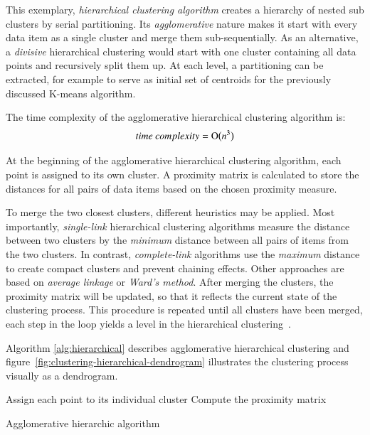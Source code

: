 This exemplary, \textit{hierarchical clustering algorithm} creates a hierarchy of nested sub clusters by serial partitioning. Its \textit{agglomerative} nature makes it start with every data item as a single cluster and merge them sub-sequentially. As an alternative, a \textit{divisive} hierarchical clustering would start with one cluster containing all data points and recursively split them up. At each level, a partitioning can be extracted, for example to serve as initial set of centroids for the previously discussed K-means algorithm. 

The time complexity of the agglomerative hierarchical clustering algorithm is:
\[time~complexity = \operatorname{O}\bigl(n^3\bigr)\]

At the beginning of the agglomerative hierarchical clustering algorithm, each point is assigned to its own cluster. A proximity matrix is calculated to store the distances for all pairs of data items based on the chosen proximity measure.

To merge the two closest clusters, different heuristics may be applied. Most importantly, \textit{single-link} hierarchical clustering algorithms measure the distance between two clusters by the \textit{minimum} distance between all pairs of items from the two clusters. In contrast, \textit{complete-link} algorithms use the \textit{maximum} distance to create compact clusters and prevent chaining effects. Other approaches are based on \textit{average linkage} or \textit{Ward's method}. After merging the clusters, the proximity matrix will be updated, so that it reflects the current state of the clustering process. This procedure is repeated until all clusters have been merged, each step in the loop yields a level in the hierarchical clustering~\cite{Jain88clustering, Jain99clusterreview, Meert06clustermaps}.

Algorithm \ref{alg:hierarchical} describes agglomerative hierarchical clustering and figure~\ref{fig:clustering-hierarchical-dendrogram} illustrates the clustering process visually as a dendrogram.

\begin{algorithm}[h]
  {Assign each point to its individual cluster}\;
  {Compute the proximity matrix}\;
  \caption{Agglomerative hierarchic algorithm~\cite{Meert06clustermaps}}
  \label{alg:hierarchical}
\end{algorithm}

